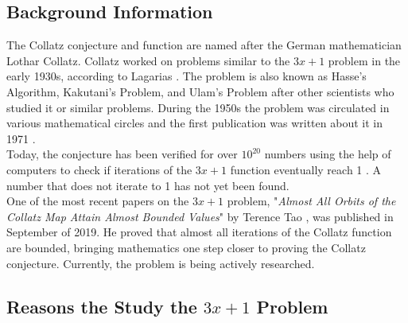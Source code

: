 \documentclass[12pt,a4paper,reqno]{amsart}
\begin{document}
\subsection{Background Information}

The Collatz conjecture and function are named after the German mathematician
Lothar Collatz. Collatz worked on problems similar to the $3x+1$ problem in the
early 1930s, according to Lagarias \cite{src:03}. The problem is also known as 
Hasse's Algorithm, Kakutani's Problem, and Ulam's Problem 
after other scientists who studied it or similar problems. During the 1950s 
the problem was circulated in various mathematical circles and the first 
publication was written about it in 1971 \cite{src:03}. \\
Today, the conjecture has been verified for over $10^{20}$ numbers using the 
help of computers to check if iterations of the $3x+1$ function eventually
reach 1 \cite{src:04}. A number that does not iterate to 1 has not yet been
found. \\
One of the most recent papers on the $3x+1$ problem, "\textit{Almost All Orbits
of the Collatz Map Attain Almost Bounded Values}" by Terence Tao \cite{src:04},
was published in September of 2019. He proved that almost all iterations of the
Collatz function are bounded, bringing mathematics one step closer to proving 
the Collatz conjecture. Currently, the problem is being actively researched.

\subsection{Reasons the Study the $3x+1$ Problem}
\end{document}
